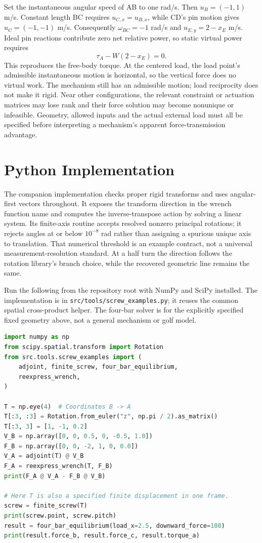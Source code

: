 Set the instantaneous angular speed of AB to one rad/s. Then $u_B=(-1,1)$ m/s. Constant length BC requires $u_{C,x}=u_{B,x}$, while CD's pin motion gives $u_C=(-1,-1)$ m/s. Consequently $\omega_{BC}=-1$ rad/s and $u_{E,y}=2-x_E$ m/s. Ideal pin reactions contribute zero net relative power, so static virtual power requires
\begin{equation}
 \tau_A-W(2-x_E)=0.
\end{equation}
This reproduces the free-body torque. At the centered load, the load point's admissible instantaneous motion is horizontal, so the vertical force does no virtual work. The mechanism still has an admissible motion; load reciprocity does not make it rigid. Near other configurations, the relevant constraint or actuation matrices may lose rank and their force solution may become nonunique or infeasible. Geometry, allowed inputs and the actual external load must all be specified before interpreting a mechanism's apparent force-transmission advantage.

\section{Python Implementation}
\label{sec:python_screws}

The companion implementation checks proper rigid transforms and uses angular-first vectors throughout. It exposes the transform direction in the wrench function name and computes the inverse-transpose action by solving a linear system. Its finite-axis routine accepts resolved nonzero principal rotations; it rejects angles at or below $10^{-8}$ rad rather than assigning a spurious unique axis to translation. That numerical threshold is an example contract, not a universal measurement-resolution standard. At a half turn the direction follows the rotation library's branch choice, while the recovered geometric line remains the same.

Run the following from the repository root with NumPy and SciPy installed. The implementation is in \texttt{src/tools/screw\_examples.py}; it reuses the common spatial cross-product helper. The four-bar solver is for the explicitly specified fixed geometry above, not a general mechanism or golf model.

\begin{lstlisting}[language=Python,columns=fullflexible,breakatwhitespace=true,label=code:screws]
import numpy as np
from scipy.spatial.transform import Rotation
from src.tools.screw_examples import (
    adjoint, finite_screw, four_bar_equilibrium,
    reexpress_wrench,
)

T = np.eye(4)  # Coordinates B -> A
T[:3, :3] = Rotation.from_euler("z", np.pi / 2).as_matrix()
T[:3, 3] = [1, -1, 0.2]
V_B = np.array([0, 0, 0.5, 0, -0.5, 1.0])
F_B = np.array([0, 0, -2, 1, 0, 0.0])
V_A = adjoint(T) @ V_B
F_A = reexpress_wrench(T, F_B)
print(F_A @ V_A - F_B @ V_B)

# Here T is also a specified finite displacement in one frame.
screw = finite_screw(T)
print(screw.point, screw.pitch)
result = four_bar_equilibrium(load_x=2.5, downward_force=100)
print(result.force_b, result.force_c, result.torque_a)
\end{lstlisting}

